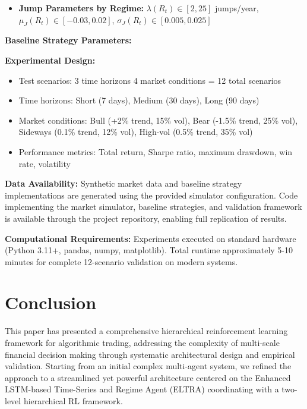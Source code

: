 \documentclass[11pt]{article}
\begin{document}
\begin{itemize}
\item \textbf{Jump Parameters by Regime:} $\lambda(R_t) \in [2, 25]$ jumps/year, $\mu_J(R_t) \in [-0.03, 0.02]$, $\sigma_J(R_t) \in [0.005, 0.025]$

\end{itemize}
\textbf{Baseline Strategy Parameters:}
\textbf{Experimental Design:}
\begin{itemize}
\item Test scenarios: 3 time horizons  4 market conditions = 12 total scenarios
\item Time horizons: Short (7 days), Medium (30 days), Long (90 days)
\item Market conditions: Bull (+2\% trend, 15\% vol), Bear (-1.5\% trend, 25\% vol), Sideways (0.1\% trend, 12\% vol), High-vol (0.5\% trend, 35\% vol)
\item Performance metrics: Total return, Sharpe ratio, maximum drawdown, win rate, volatility

\end{itemize}
\textbf{Data Availability:}
Synthetic market data and baseline strategy implementations are generated using the provided simulator configuration. Code implementing the market simulator, baseline strategies, and validation framework is available through the project repository, enabling full replication of results.

\textbf{Computational Requirements:}
Experiments executed on standard hardware (Python 3.11+, pandas, numpy, matplotlib). Total runtime approximately 5-10 minutes for complete 12-scenario validation on modern systems.

\section{Conclusion}

This paper has presented a comprehensive hierarchical reinforcement learning framework for algorithmic trading, addressing the complexity of multi-scale financial decision making through systematic architectural design and empirical validation. Starting from an initial complex multi-agent system, we refined the approach to a streamlined yet powerful architecture centered on the Enhanced LSTM-based Time-Series and Regime Agent (ELTRA) coordinating with a two-level hierarchical RL framework.
\end{document}

